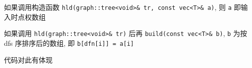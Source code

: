 如果调用构造函数 \verb|hld(graph::tree<void>& tr, const vec<T>& a)|, 则 \verb|a| 即输入时点权数组

如果调用 \verb|hld(graph::tree<void>& tr)| 后再 \verb|build(const vec<T>& b)|, \verb|b| 为按 dfs 序排序后的数组, 即 \verb|b[dfn[i]] = a[i]|

代码对此有体现